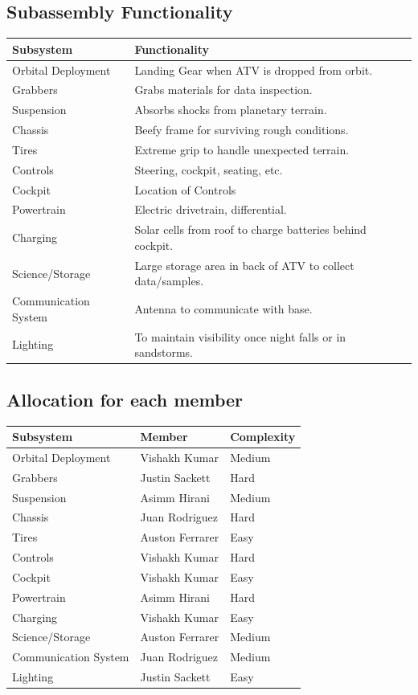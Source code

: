 \subsection{Subassembly Functionality}
\begin{center}
\begin{tabular}{lll}
\hline
Subsystem & Functionality\\
\hline
Orbital Deployment & Landing Gear when ATV is dropped from orbit. \\
Grabbers & Grabs materials for data inspection.\\
Suspension & Absorbs shocks from planetary terrain. \\
Chassis & Beefy frame for surviving rough conditions.\\
Tires & Extreme grip to handle unexpected terrain. \\
Controls & Steering, cockpit, seating, etc.\\
Cockpit & Location of Controls\\
Powertrain & Electric drivetrain, differential. \\
Charging & Solar cells from roof to charge batteries behind cockpit. \\
Science/Storage & Large storage area in back of ATV to collect data/samples. \\
Communication System & Antenna to communicate with base. \\
Lighting & To maintain visibility once night falls or in sandstorms.\\
\hline
\end{tabular}
\end{center}

\subsection{Allocation for each member}

\begin{center}
\begin{tabular}{lll}
\hline
Subsystem & Member& Complexity\\
\hline
Orbital Deployment & Vishakh Kumar& Medium\\
Grabbers & Justin Sackett & Hard\\
Suspension & Asimm Hirani & Medium\\
Chassis & Juan Rodriguez & Hard\\
Tires & Auston Ferrarer& Easy\\
Controls & Vishakh Kumar & Hard\\
Cockpit & Vishakh Kumar & Easy\\
Powertrain & Asimm Hirani & Hard\\
Charging & Vishakh Kumar & Easy \\
Science/Storage & Auston Ferrarer & Medium\\
Communication System & Juan Rodriguez & Medium\\
Lighting & Justin Sackett& Easy\\
\hline
\end{tabular}
\end{center}

